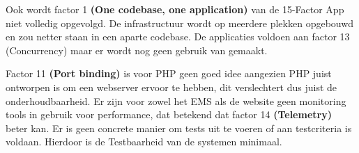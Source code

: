 Ook wordt factor 1 \textbf{(One codebase, one application)} van de 15-Factor App niet volledig opgevolgd. De infrastructuur wordt op meerdere plekken opgebouwd en zou netter staan in een aparte codebase. De applicaties voldoen aan factor 13 (Concurrency) maar er wordt nog geen gebruik van gemaakt. 

Factor 11 \textbf{(Port binding)} is voor PHP geen goed idee aangezien PHP juist ontworpen is om een webserver ervoor te hebben, dit verslechtert dus juist de onderhoudbaarheid. Er zijn voor zowel het EMS als de website geen monitoring tools in gebruik voor performance, dat betekend dat factor 14 \textbf{(Telemetry)} beter kan. Er is geen concrete manier om tests uit te voeren of aan testcriteria is voldaan. Hierdoor is de Testbaarheid van de systemen minimaal.